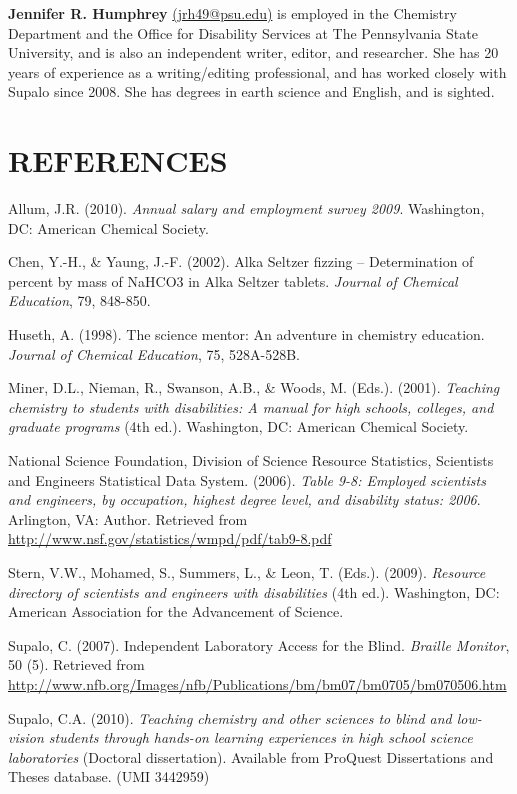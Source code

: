 \documentclass[11.5pt]{sig-alternate} %
\begin{document}
\begin{large}
\textbf{Jennifer R. Humphrey} \href{mailto:jrh49@psu.edu}{(jrh49@psu.edu)} is employed in the Chemistry Department and the Office for Disability Services at The Pennsylvania State University, and is also an independent writer, editor, and researcher. She has 20 years of experience as a writing/editing professional, and has worked closely with Supalo since 2008. She has degrees in earth science and English, and is sighted.

\clearpage
\end{large}
\section*{REFERENCES}\par 

\leftskip 0.25in
\parindent -0.25in 

Allum, J.R. (2010). \textit{Annual salary and employment survey 2009}. Washington, DC: American Chemical Society.

Chen, Y.-H., \& Yaung, J.-F. (2002). Alka Seltzer fizzing – Determination of percent by mass of NaHCO3 in Alka Seltzer tablets. \textit{Journal of Chemical Education}, 79, 848-850.

Huseth, A. (1998). The science mentor: An adventure in chemistry education. \textit{Journal of Chemical Education}, 75, 528A-528B.

Miner, D.L., Nieman, R., Swanson, A.B., \& Woods, M. (Eds.). (2001). \textit{Teaching chemistry to students with disabilities: A manual for high schools, colleges, and graduate programs} (4th ed.). Washington, DC: American Chemical Society.

National Science Foundation, Division of Science Resource Statistics, Scientists and Engineers Statistical Data System. (2006). \textit{Table 9-8: Employed scientists and engineers, by occupation, highest degree level, and disability status: 2006}. Arlington, VA: Author. Retrieved from \url{http://www.nsf.gov/statistics/wmpd/pdf/tab9-8.pdf}

Stern, V.W., Mohamed, S., Summers, L., \& Leon, T. (Eds.). (2009). \textit{Resource directory of scientists and engineers with disabilities} (4th ed.). Washington, DC: American Association for the Advancement of Science.

\newpage Supalo, C. (2007). Independent Laboratory Access for the Blind. \textit{Braille Monitor}, 50 (5). Retrieved from \url{http://www.nfb.org/Images/nfb/Publications/bm/bm07/bm0705/bm070506.htm}

Supalo, C.A. (2010). \textit{Teaching chemistry and other sciences to blind and low-vision students through hands-on learning experiences in high school science laboratories} (Doctoral dissertation). Available from ProQuest Dissertations and Theses database. (UMI 3442959)
\end{document}
